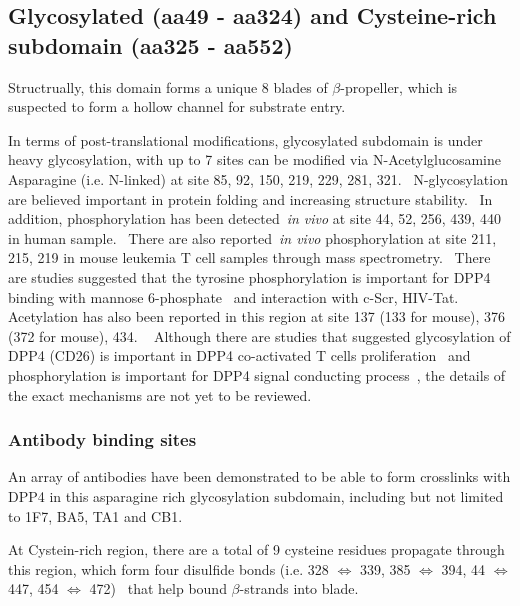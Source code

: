 \subsection{Glycosylated (aa49 - aa324) and Cysteine-rich subdomain (aa325 - aa552)}

Structrually, this domain forms a unique 8 blades of $\beta$-propeller, which is suspected to form a hollow channel for substrate entry.

In terms of post-translational modifications, glycosylated subdomain is under heavy glycosylation, with up to 7 sites can be modified via N-Acetylglucosamine Asparagine (i.e. N-linked) at site 85, 92, 150, 219, 229, 281, 321.~\cite{Rasmussen2003,Thoma2003,Meng2010,Chen2009,Hiramatsu2003} N-glycosylation are believed important in protein folding and increasing structure stability.~\cite{Fan_1997} In addition, phosphorylation has been detected~\textit{in vivo} at site 44, 52, 256, 439, 440 in human sample.~\cite{Xia2008, Hornbeck2015, Mertins2014} There are also reported~\textit{in vivo} phosphorylation at site 211, 215, 219 in mouse leukemia T cell samples through mass spectrometry.~\cite{Hornbeck2015} There are studies suggested that the tyrosine phosphorylation is important for DPP4 binding with mannose 6-phosphate~\cite{Ikushima_2000} and interaction with c-Scr, HIV-Tat.~\cite{Bilodeau_2006,Fan_2012}
Acetylation has also been reported in this region at site 137 (133 for mouse), 376 (372 for mouse), 434. ~\cite{Lundby2012,Weinert2013} Although there are studies that suggested glycosylation of DPP4 (CD26) is important in DPP4 co-activated T cells proliferation~\cite{Ikushima_2000} and phosphorylation is important for DPP4 signal conducting process~\cite{Ishii_2001}, the details of the exact mechanisms are not yet to be reviewed.
\par

\subsubsection{Antibody binding sites}
An array of antibodies have been demonstrated to be able to form crosslinks with DPP4 in this asparagine rich glycosylation subdomain, including but not limited to 1F7, BA5, TA1 and CB1. ~\cite{Hegen1997,Gaetaniello1998}
\par

At Cystein-rich region, there are a total of 9 cysteine residues propagate through this region, which form four disulfide bonds (i.e. 328 $\Leftrightarrow$ 339, 385 $\Leftrightarrow$ 394, 44 $\Leftrightarrow$ 447, 454 $\Leftrightarrow$ 472)~\cite{Hiramatsu2003} that help bound $\beta$-strands into blade. 

